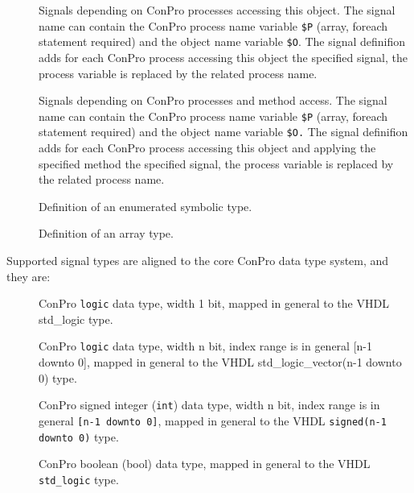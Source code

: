 \documentclass[a4paper,12pt,twoside,english]{article}
\begin{document}
\begin{description}
\begin{description}
\item[] $ $\\
Signals depending on ConPro processes accessing this object. The signal name can contain the ConPro process name variable {\tt \$P} (array, foreach statement
required) and the object name variable {\tt \$O}. The signal definifion adds for each ConPro process accessing this object the specified signal, the process
variable is replaced by the related process name. 

\item[] $ $\\
Signals depending  on ConPro processes and method access. The signal name can contain the ConPro process name variable {\tt \$P} (array, foreach statement
required) and the object name variable {\tt \$O.} The signal definifion adds for each ConPro process accessing this object and applying the specified method the
specified signal, the process variable is replaced by the related process name. 

\item[] $ $\\
Definition of an enumerated symbolic type.

\item[] $ $\\
Definition of an array type.


\end{description}
Supported signal types are aligned to the core ConPro data type system, and they are:


\begin{description}
\item[] $ $\\
ConPro {\tt logic} data type,  width 1 bit, mapped in general to the VHDL std\_logic type. 

\item[] $ $\\
ConPro {\tt logic} data type, width n bit, index range is in general {[}n-1 downto 0{]}, mapped in general to the VHDL std\_logic\_vector(n-1 downto 0)  type.

\item[] $ $\\
ConPro signed integer ({\tt int}) data type, width n bit, index range is in general {\tt {[}n-1 downto 0{]}}, mapped in general to the VHDL {\tt signed(n-1
downto 0)}  type.

\item[] $ $\\
ConPro boolean (bool) data type,   mapped in general to the VHDL {\tt std\_logic} type.


\end{description}
\end{description}
\end{document}
